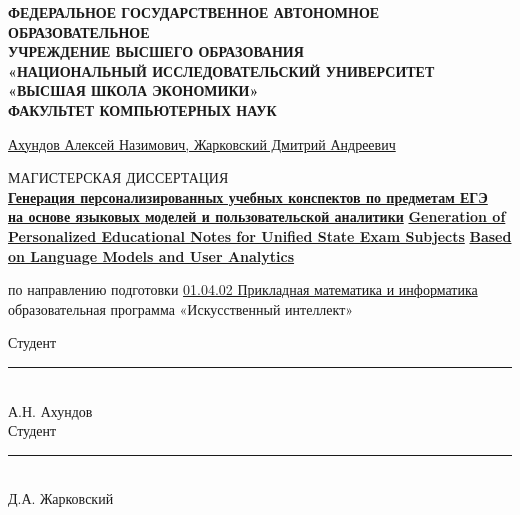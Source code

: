 \begin{titlepage}
\newpage
{\selectfont
\begin{center}
{\bfseries
\MakeUppercase{Федеральное государственное автономное образовательное}\\
\MakeUppercase{учреждение высшего образования}\\
\MakeUppercase{«Национальный исследовательский университет}\\
\MakeUppercase{«Высшая школа экономики»}\\
\MakeUppercase{Факультет компьютерных наук}
}
\end{center}

\vspace{3em}

\begin{center}
\underline{Ахундов Алексей Назимович, Жарковский Дмитрий Андреевич}
\end{center}

\vspace{2em}

\begin{center}
МАГИСТЕРСКАЯ ДИССЕРТАЦИЯ\\[0.5em]
{\bf \underline{Генерация персонализированных учебных конспектов по предметам ЕГЭ}}\\[0.3em]
{\bf \underline{на основе языковых моделей и пользовательской аналитики}}
{\bf \underline{Generation of Personalized Educational Notes for Unified State Exam Subjects}}
{\bf \underline{Based on Language Models and User Analytics}}
\end{center}

\vspace{2em}

\begin{center}
{
по направлению подготовки \underline{01.04.02 Прикладная математика и информатика}\\
образовательная программа «Искусственный интеллект»
}
\end{center}

\vfill

\noindent
\begin{minipage}[t]{0.45\textwidth}
Студент\\[1em]
\rule{5cm}{0.4pt}\\
А.Н. Ахундов\\[1em]
Студент\\[1em]
\rule{5cm}{0.4pt}\\
Д.А. Жарковский
\end{minipage}%

}
\end{titlepage}
